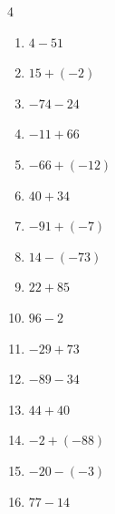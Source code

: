 \begin{multicols}{4}
\begin{enumerate}
  \item $4-51$

        \phantom{$=-47$}

  \item $15+(-2)$

        \phantom{$=13$}

  \item $-74-24$

        \phantom{$=-98$}

  \item $-11+66$

        \phantom{$=55$}

  \item $-66+(-12)$

        \phantom{$=-78$}

  \item $40+34$

        \phantom{$=74$}

  \item $-91+(-7)$

        \phantom{$=-98$}

  \item $14-(-73)$

        \phantom{$=87$}

  \item $22+85$

        \phantom{$=107$}

  \item $96-2$

        \phantom{$=94$}

  \item $-29+73$

        \phantom{$=44$}

  \item $-89-34$

        \phantom{$=-123$}

\columnbreak %

  \item $44+40$

        \phantom{$=84$}

  \item $-2+(-88)$

        \phantom{$=-90$}

  \item $-20-(-3)$

        \phantom{$=-17$}

  \item $77-14$


\end{enumerate}
\end{multicols}

